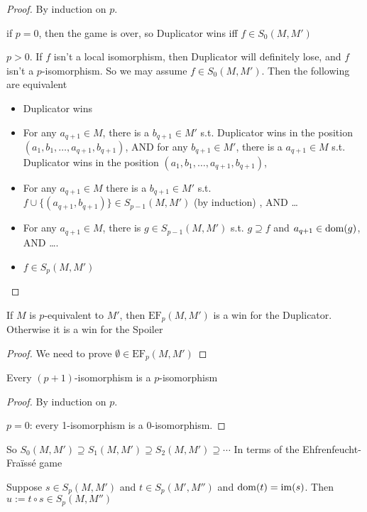 \documentclass[11pt]{article}
\def \EF {\text{EF}}
\begin{document}
\begin{proof}
By induction on \(p\).

if \(p=0\), then the game is over, so Duplicator wins iff \(f\in S_0(M,M')\)

\(p>0\). If \(f\) isn't a local isomorphism, then Duplicator will definitely lose, and \(f\)
isn't a \(p\)-isomorphism. So we may assume \(f\in S_0(M,M')\). Then the following are equivalent
\begin{itemize}
\item Duplicator wins
\item For any \(a_{q+1}\in M\), there is a \(b_{q+1}\in M'\) s.t. Duplicator wins in the
position \((a_1,b_1,\dots,a_{q+1},b_{q+1})\),  AND for any \(b_{q+1}\in M'\), there is a \(a_{q+1}\in M\) s.t. Duplicator wins in the
position \((a_1,b_1,\dots,a_{q+1},b_{q+1})\),
\item For any \(a_{q+1}\in M\) there is a \(b_{q+1}\in M'\)
s.t. \(f\cup\{(a_{q+1},b_{q+1})\}\in S_{p-1}(M,M')\) (by induction) , AND \ldots{}
\item For any \(a_{q+1}\in M\), there is \(g\in S_{p-1}(M,M')\) s.t. \(g\supseteq f\) and \(a_{q+1}\in\operatorname{dom}(g)\),
AND \ldots{}.
\item \(f\in S_p(M,M')\)
\end{itemize}
\end{proof}

\begin{theorem}[]
If \(M\) is \(p\)-equivalent to \(M'\), then \(\EF_p(M,M')\) is a win for the Duplicator.
Otherwise it is a win for the Spoiler
\end{theorem}

\begin{proof}
We need to prove \(\emptyset\in\EF_p(M,M')\)
\end{proof}

\begin{theorem}[]
Every \((p+1)\)-isomorphism is a \(p\)-isomorphism
\end{theorem}

\begin{proof}
By induction on \(p\).

\(p=0\): every 1-isomorphism is a 0-isomorphism.
\end{proof}

So \(S_0(M,M')\supseteq S_1(M,M')\supseteq S_2(M,M')\supseteq\cdots\) In terms of the Ehfrenfeucht-Fraïssé game

\begin{theorem}[]
Suppose \(s\in S_p(M,M')\) and \(t\in S_p(M',M'')\) and \(\operatorname{dom}(t)=\operatorname{im}(s)\). Then \(u:=t\circ s\in S_p(M,M'')\)
\end{theorem}
\end{document}
